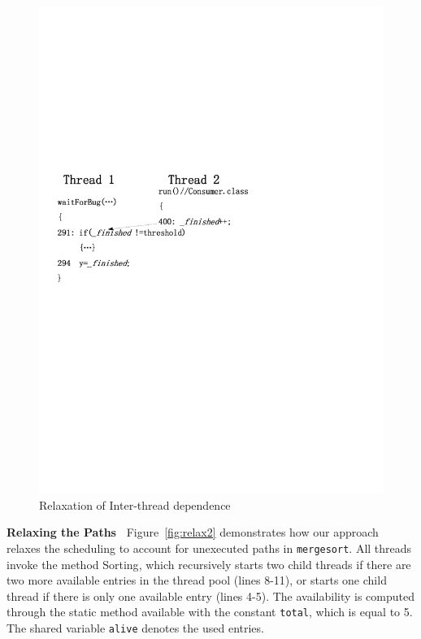  

\begin{figure}[htp]
\centering
\includegraphics[scale=0.45]{figs/Visio-bbuffer.pdf}
\caption{Relaxation of Inter-thread dependence}\label{fig:relax1}
\end{figure}

{\bf Relaxing the Paths\ } Figure~\ref{fig:relax2} demonstrates how our 
approach relaxes the scheduling to account for  unexecuted paths in 
{\tt mergesort}. 
All threads invoke the method {\sf Sorting}, which recursively starts 
two child threads if there are two more available entries in the 
thread pool (lines 8-11), or starts one child thread if there is only 
one available entry (lines 4-5).  The availability is computed through 
the static method {\sf available} with the constant {\tt total}, which is equal to 5. The shared variable {\tt alive} denotes the used entries.

